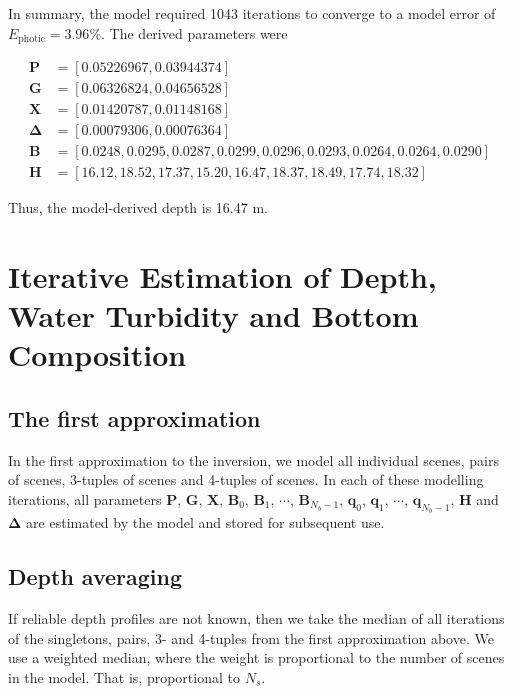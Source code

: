 \documentclass[12pt]{article}
\numberwithin{equation}{section}
\begin{document}
In summary, the model required 1043 iterations to converge to a model error of 
$E_{\text{photic}} = 3.96\%$. The derived parameters were 
\begin{linenomath}
\begin{align*}
\textbf{P} & = \left[0.05226967, 0.03944374 \right] \\
\textbf{G} & = \left[0.06326824, 0.04656528 \right] \\
\textbf{X} & = \left[0.01420787, 0.01148168 \right] \\
\mathbf{\Delta} & = \left[0.00079306, 0.00076364 \right] \\
\textbf{B} & = \left[0.0248, 0.0295, 0.0287, 0.0299, 0.0296, 0.0293, 0.0264, 0.0264, 0.0290 \right] \\ 
\textbf{H} & = \left[16.12, 18.52, 17.37, 15.20, 16.47, 18.37, 18.49, 17.74, 18.32 \right]
\end{align*}
\end{linenomath}
Thus, the model-derived depth is 16.47 m. 

\section{Iterative Estimation of Depth, Water Turbidity and Bottom Composition}

	\subsection{The first approximation}\label{first_approximation}

In the first approximation to the inversion, we model all individual scenes, pairs of 
scenes, 3-tuples of scenes and 4-tuples of scenes. In each of these modelling iterations, 
all parameters \textbf{P}, \textbf{G}, \textbf{X}, $\textbf{B}_0$, $\textbf{B}_1$, 
$\cdots$, $\textbf{B}_{N_b-1}$, $\textbf{q}_0$, $\textbf{q}_1$, $\cdots$, 
$\textbf{q}_{N_b-1}$, \textbf{H} and $\mathbf{\Delta}$ are estimated by the model and 
stored for subsequent use. 

	\subsection{Depth averaging}

If reliable depth profiles are not known, then we take the median of all 
iterations of the singletons, pairs, 3- and 4-tuples from the first approximation 
above. We use a weighted median, where the weight is proportional to the number of 
scenes in the model. That is, proportional to $N_s$. 
\end{document}
